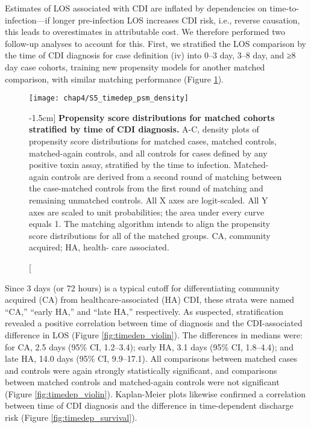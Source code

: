 Estimates of LOS associated with CDI are inflated by dependencies on time-to-infection—if longer pre-infection LOS increases CDI risk, i.e., reverse causation, this leads to overestimates in attributable cost.\autocite{Mitchell2014,Stevens2015} We therefore performed two follow-up analyses to account for this. First, we stratified the LOS comparison by the time of CDI diagnosis for case definition (iv) into 0–3 day, 3–8 day, and ≥8 day case cohorts, training new propensity models for another matched comparison, with similar matching performance (Figure \ref{fig:timedep_psm_density}).
\begin{figure}[htb]
  \texttt{[image: chap4/S5\_timedep\_psm\_density]}
  \caption[Propensity score distributions for matched cohorts stratified by time of \emph{C. difficile} infection diagnosis][-1.5cm]{
    \textbf{Propensity score distributions for matched cohorts stratified by time of CDI diagnosis.} A-C, density plots of propensity score distributions for matched cases, matched controls, matched-again controls, and all controls for cases defined by any positive toxin assay, stratified by the time to infection. Matched-again controls are derived from a second round of matching between the case-matched controls from the first round of matching and remaining unmatched controls. All X axes are logit-scaled. All Y axes are scaled to unit probabilities; the area under every curve equals 1. The matching algorithm intends to align the propensity score distributions for all of the matched groups. CA, community acquired; HA, health- care associated.
  }
  \label{fig:timedep_psm_density}
\end{figure}
Since 3 days (or 72 hours) is a typical cutoff for differentiating community acquired (CA) from healthcare-associated (HA) CDI,\autocite{Longtin2016,Polage2015} these strata were named “CA,” “early HA,” and “late HA,” respectively. As suspected, stratification revealed a positive correlation between time of diagnosis and the CDI-associated difference in LOS (Figure \ref{fig:timedep_violin}). The differences in medians were: for CA, 2.5 days (95\% CI, 1.2–3.4); early HA, 3.1 days (95\% CI, 1.8–4.4); and late HA, 14.0 days (95\% CI, 9.9–17.1). All comparisons between matched cases and controls were again strongly statistically significant, and comparisons between matched controls and matched-again controls were not significant (Figure \ref{fig:timedep_violin}). Kaplan-Meier plots likewise confirmed a correlation between time of CDI diagnosis and the difference in time-dependent discharge risk (Figure \ref{fig:timedep_survival}).

